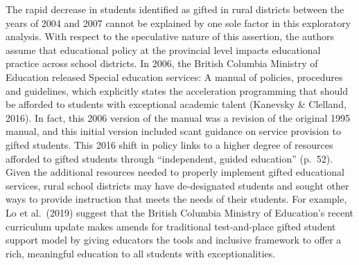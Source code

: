 \documentclass[
  english,
  man]{apa6}
\begin{document}
The rapid decrease in students identified as gifted in rural districts between the years of 2004 and 2007 cannot be explained by one sole factor in this exploratory analysis. With respect to the speculative nature of this assertion, the authors assume that educational policy at the provincial level impacts educational practice across school districts. In 2006, the British Columbia Ministry of Education released Special education services: A manual of policies, procedures and guidelines, which explicitly states the acceleration programming that should be afforded to students with exceptional academic talent (Kanevsky \& Clelland, 2016). In fact, this 2006 version of the manual was a revision of the original 1995 manual, and this initial version included scant guidance on service provision to gifted students. This 2016 shift in policy links to a higher degree of resources afforded to gifted students through \enquote{independent, guided education} (p.~52). Given the additional resources needed to properly implement gifted educational services, rural school districts may have de-designated students and sought other ways to provide instruction that meets the needs of their students. For example, Lo et al.~(2019) suggest that the British Columbia Ministry of Education's recent curriculum update makes amends for traditional test-and-place gifted student support model by giving educators the tools and inclusive framework to offer a rich, meaningful education to all students with exceptionalities.
\end{document}
